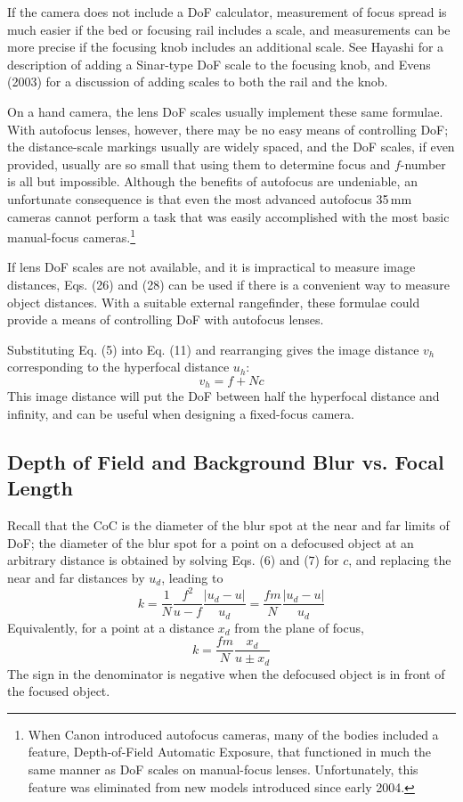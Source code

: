 \documentclass[11pt, oneside]{scrartcl}   	%
\begin{document}
If the camera does not include a DoF calculator, measurement of focus spread is much easier if the bed or focusing rail includes a scale, and measurements can be more precise if the focusing knob includes an additional scale. See Hayashi for a description of adding a Sinar-type DoF scale to the focusing knob, and Evens (2003) for a discussion of adding scales to both the rail and the knob.

On a hand camera, the lens DoF scales usually implement these same formulae. With autofocus lenses, however, there may be no easy means of controlling DoF; the distance-scale markings usually are widely spaced, and the DoF scales, if even provided, usually are so small that using them to determine focus and $f$-number is all but impossible. Although the benefits of autofocus are undeniable, an unfortunate consequence is that even the most advanced autofocus 35\,mm cameras cannot perform a task that was easily accomplished with the most basic manual-focus cameras.\footnote{When Canon introduced autofocus cameras, many of the bodies included a feature, Depth-of-Field Automatic Exposure, that functioned in much the same manner as DoF scales on manual-focus lenses. Unfortunately, this feature was eliminated from new models introduced since early 2004.}

If lens DoF scales are not available, and it is impractical to measure image distances, Eqs. (26) and (28) can be used if there is a convenient way to measure object distances. With a suitable external rangefinder, these formulae could provide a means of controlling DoF with autofocus lenses.

Substituting Eq. (5) into Eq. (11) and rearranging gives the image distance $v_h$ corresponding to the hyperfocal distance $u_h$:
\begin{equation}
   v_h = f + Nc
   \label{eq:vh} 
\end{equation}
This image distance will put the DoF between half the hyperfocal distance and infinity, and
can be useful when designing a fixed-focus camera.
\subsection{Depth of Field and Background Blur vs. Focal Length}

Recall that the CoC is the diameter of the blur spot at the near and far limits of DoF; the diameter of the blur spot for a point on a defocused object at an arbitrary distance is obtained by solving Eqs. (6) and (7) for $c$, and replacing the near and far distances by $u_d$, leading to
\begin{equation}
   k = \frac1N \frac{f^2}{u-f}  \frac{|u_d - u|}{u_d} = \frac{fm}N \frac{|u_d - u|}{u_d}
   \label{eq:k1}
\end{equation}
Equivalently, for a point at a distance $x_d$ from the plane of focus, 
\begin{equation}
   k = \frac{fm}N \frac{x_d}{u\pm x_d}
   \label{eq:k2}
\end{equation}
 The sign in the denominator is negative when the defocused object is in front of the focused object.
\end{document}
